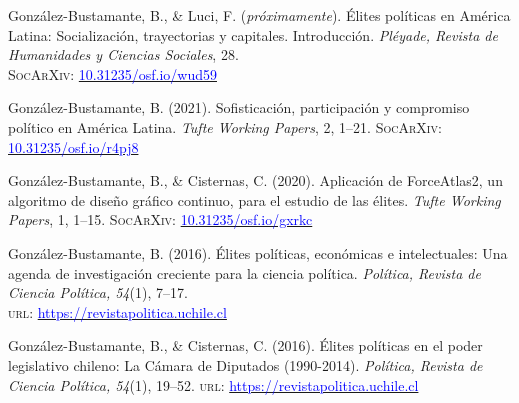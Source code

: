 \begin{publications}

\begin{benumerate}{12}

\item{\small Gonz\'alez-Bustamante, B., \& Luci, F. ({\itshape próximamente}). Élites políticas en América Latina: Socialización, trayectorias y capitales. Introducción. {\itshape Pléyade, Revista de Humanidades y Ciencias Sociales}, 28. \\ {\scshape \footnotesize SocArXiv}: \href{https://doi.org/10.31235/osf.io/wud59}{\textcolor{blue}{10.31235/osf.io/wud59}}}\vspace{1mm}

\item{\small Gonz\'alez-Bustamante, B. (2021). Sofisticación, participación y compromiso político en América Latina. {\itshape Tufte Working Papers}, 2, 1--21. {\scshape \footnotesize SocArXiv}: \href{https://doi.org/10.31235/osf.io/r4pj8}{\textcolor{blue}{10.31235/osf.io/r4pj8}}}\vspace{1mm}

\item{\small Gonz\'alez-Bustamante, B., \& Cisternas, C. (2020). Aplicación de ForceAtlas2, un algoritmo de diseño gráfico continuo, para el estudio de las élites. {\itshape Tufte Working Papers}, 1, 1--15. {\scshape \footnotesize SocArXiv}: \href{https://doi.org/10.31235/osf.io/gxrkc}{\textcolor{blue}{10.31235/osf.io/gxrkc}}}\vspace{1mm}

\item{\small Gonz\'alez-Bustamante, B. (2016). Élites políticas, económicas e intelectuales: Una agenda de investigación creciente para la ciencia política. {\itshape Pol\'itica, Revista de Ciencia Pol\'itica, 54}(1), 7--17. \\ {\scshape url}: \href{https://revistapolitica.uchile.cl/index.php/RP/article/view/42690}{\textcolor{blue}{https://revistapolitica.uchile.cl}}}\vspace{1mm}

\item{\small Gonz\'alez-Bustamante, B., \& Cisternas, C. (2016). Élites políticas en el poder legislativo chileno: La Cámara de Diputados (1990-2014). {\itshape Pol\'itica, Revista de Ciencia Pol\'itica, 54}(1), 19--52. {\scshape url}: \href{https://revistapolitica.uchile.cl/index.php/RP/article/view/42691}{\textcolor{blue}{https://revistapolitica.uchile.cl}}}\vspace{1mm}


\end{benumerate}
\end{publications}
